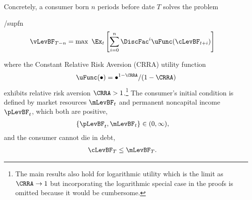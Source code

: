 \documentclass[BufferStockTheory]{subfiles}
\begin{document}
Concretely, a consumer born $n$ periods before date $T$ solves the problem
\begin{verbatimwrite}{\EqDir/supfn}
  \begin{align*}%
    \vLevBF_{T-n} & = \max~ \Ex_{t}\left[\sum_{i=0}^{n} \DiscFac^{i} \uFunc(\cLevBF_{t+i})\right]
  \end{align*}
\end{verbatimwrite}

where the Constant Relative Risk Aversion (CRRA) utility function
\begin{align*}
  \uFunc(\bullet)=\bullet^{1-\CRRA}/(1-\CRRA) %
\end{align*}
exhibits relative risk aversion $\CRRA > 1$.\footnote{The main
  results also hold for logarithmic utility which is the limit as
  $\CRRA \rightarrow 1$ but incorporating the logarithmic special case
  in the proofs is omitted because it would be cumbersome.}  The consumer's initial condition is
defined by market resources $\mLevBF_{t}$ and permanent noncapital income $\pLevBF_{t}$, which
both are positive,
\begin{align}
  \{\pLevBF_{t},\mLevBF_{t}\} & \in (0,\infty) \label{eq:pLevBFandmLevBFgt0},
\end{align}
and the consumer cannot die in debt,
\begin{align}
  \cLevBF_{T} & \leq  \mLevBF_{T} \label{eq:NoDebtAtDeath}.
\end{align}

\hypertarget{checkRestrictions}{}
\end{document}
